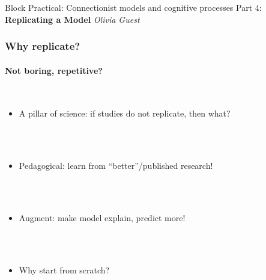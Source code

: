 \documentclass{beamer}
\begin{document}
\begin{frame}[fragile]

\centering\Huge Block Practical: Connectionist models and cognitive processes
\vfill \huge
\centering Part 4: \textbf{Replicating a Model} \large
\vfill
\textit{
Olivia Guest }

\end{frame}


\begin{frame}[fragile]
\frametitle{Why replicate?}
\framesubtitle{Not boring, repetitive?}
        \  \\

\begin{itemize}
\item<2-> A pillar of science: if studies do not replicate, then what?

\ \\

\ \\

 \item <3->Pedagogical: learn from ``better''/published research!
 
\ \\

 \ \\
 
\item<4-> Augment:  make model explain, predict more!

 
\ \\

 \ \\
 
\item<5-> Why start from scratch?
\end{itemize}


\end{frame}
\end{document}
